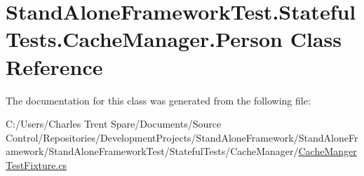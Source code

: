\hypertarget{class_stand_alone_framework_test_1_1_stateful_tests_1_1_cache_manager_1_1_person}{\section{Stand\+Alone\+Framework\+Test.\+Stateful\+Tests.\+Cache\+Manager.\+Person Class Reference}
\label{class_stand_alone_framework_test_1_1_stateful_tests_1_1_cache_manager_1_1_person}
}


The documentation for this class was generated from the following file\+:\begin{DoxyCompactItemize}
\item 
C\+:/\+Users/\+Charles Trent Spare/\+Documents/\+Source Control/\+Repositories/\+Development\+Projects/\+Stand\+Alone\+Framework/\+Stand\+Alone\+Framework/\+Stand\+Alone\+Framework\+Test/\+Stateful\+Tests/\+Cache\+Manager/\hyperlink{_cache_manger_test_fixture_8cs}{Cache\+Manger\+Test\+Fixture.\+cs}\end{DoxyCompactItemize}
